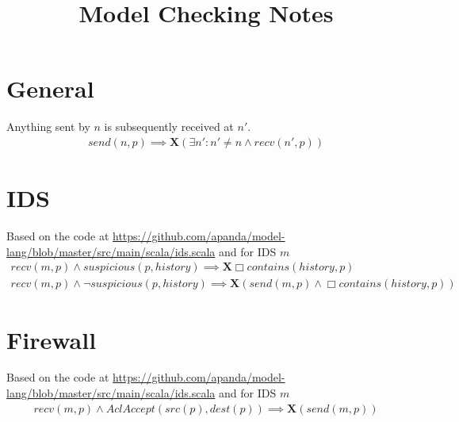 \documentclass{article}
\title{Model Checking Notes}
\author{}
\date{}
\begin{document}
\section{General}
Anything sent by $n$ is subsequently received at $n'$.
     \begin{align*}
         send(n, p) \implies \textbf{X} (\exists n': n' \neq n \land recv(n', p))
     \end{align*}
\section{IDS}
Based on the code at \url{https://github.com/apanda/model-lang/blob/master/src/main/scala/ids.scala} and for IDS $m$
     \begin{align*}
         recv(m, p) \land suspicious(p, history) \implies \textbf{X}\Box contains(history, p)\\
         recv(m, p) \land \lnot suspicious(p, history) \implies \textbf{X} (send(m, p) \land \Box contains(history, p))
     \end{align*}
\section{Firewall}
Based on the code at \url{https://github.com/apanda/model-lang/blob/master/src/main/scala/ids.scala} and for IDS $m$
     \begin{align*}
         recv(m, p) \land AclAccept (src(p), dest(p)) \implies \textbf{X} (send(m, p))
     \end{align*}
\end{document}
